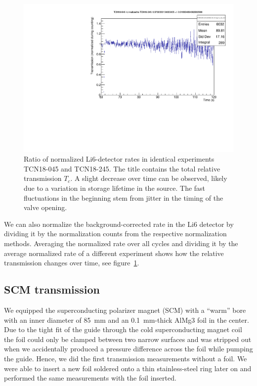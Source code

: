 \documentclass[10pt,letterpaper]{article}
\begin{document}
\begin{figure}
\centering
\includegraphics[width=\textwidth,page=1]{../transmission/TCN18-045_TCN18-245.pdf}
\caption{Ratio of normalized Li6-detector rates in identical experiments TCN18-045 and TCN18-245. The title contains the total relative transmission $T_c$. A slight decrease over time can be observed, likely due to a variation in storage lifetime in the source. The fast fluctuations in the beginning stem from jitter in the timing of the valve opening.}
\label{fig:rate_ratio_normalized}
\end{figure}

We can also normalize the background-corrected rate in the Li6 detector by dividing it by the normalization counts from the respective normalization methods. Averaging the normalized rate over all cycles and dividing it by the average normalized rate of a different experiment shows how the relative transmission changes over time, see figure~\ref{fig:rate_ratio_normalized}.

\subsection{SCM transmission}

We equipped the superconducting polarizer magnet (SCM) with a ``warm'' bore with an inner diameter of \SI{85}{\milli\meter} and an \SI{0.1}{\milli\meter}-thick AlMg3 foil in the center. Due to the tight fit of the guide through the cold superconducting magnet coil the foil could only be clamped between two narrow surfaces and was stripped out when we accidentally produced a pressure difference across the foil while pumping the guide. Hence, we did the first transmission measurements without a foil. We were able to insert a new foil soldered onto a thin stainless-steel ring later on and performed the same measurements with the foil inserted.
\end{document}
